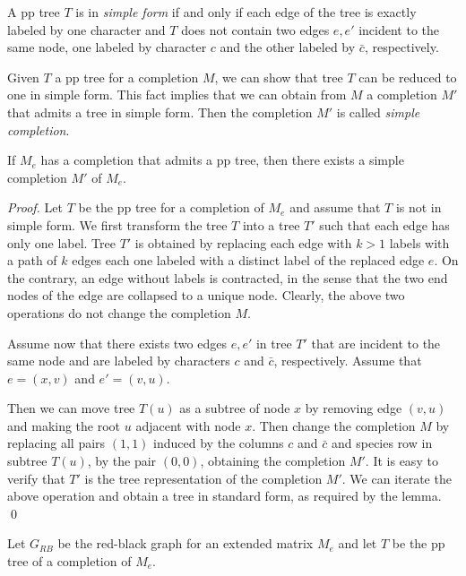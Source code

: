 \documentclass{llncs}
\begin{document}
A pp tree $T$  is in  {\em simple form } if and only if  each edge of the tree is exactly labeled by one character and $T$ does not contain  two  edges $e, e'$ incident to the same node,  one labeled by character $c$ and the other labeled by $\bar{c}$, respectively.  

Given $T$ a pp tree for a completion $M$, we can show that tree $T$ can be reduced to one in simple form. This fact implies that we can obtain from $M$   a  completion $M'$  that admits a tree in simple form. Then the completion  $M'$ is called {\em simple completion}.

\begin{lemma}
\label{tec0}
If $M_e$ has a completion that  admits a pp tree, then  there exists a simple completion $M'$ of $M_e$.  
\end{lemma}

\begin{proof}
Let $T$ be the pp tree  for a completion of $M_e$ and 
assume that $T$ is not in simple form.  We first transform the tree $T$ into a tree $T'$ such that each edge has only one label. Tree $T'$ is   obtained by replacing each edge   with $k >1 $ labels with a path of $k$ edges each one labeled with a distinct label of the replaced edge $e$. On the contrary, an edge without labels is contracted, in the sense that the two end nodes of the edge are collapsed to a unique node. Clearly, the above two operations do not change the completion  $M$.



Assume now that there exists two edges $e, e'$ in  tree $T'$ that are incident to the same node and are labeled by  characters $c$ and $\bar{c}$, respectively. Assume that $e = (x,v)$ and $e'=(v, u)$.  

Then we can move tree $T(u)$ as a subtree of  node $x$ by removing edge $(v,u)$  and making the root $u$ adjacent with node $x$. Then change the completion $M$ by replacing all pairs $(1,1)$ induced by the columns $c$ and $\bar{c}$  and species row in subtree $T(u)$,  by the pair $(0,0)$, obtaining the completion $M'$. It is easy to verify that $T'$ is the tree representation of the completion $M'$.
We can iterate the above operation and obtain a tree in standard form, as required by the lemma.
\qed


\end{proof}

Let $G_{RB}$ be the red-black graph for an extended matrix  $M_e$ and let  $T$ be   the pp tree of a completion of $M_e$.
\end{document}
